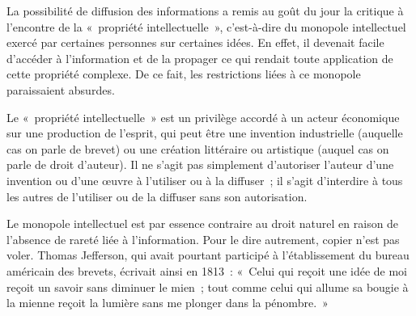 La possibilité de diffusion des informations a remis au goût du jour la critique à l'encontre de la «~propriété intellectuelle~», c'est-à-dire du monopole intellectuel exercé par certaines personnes sur certaines idées. En effet, il devenait facile d'accéder à l'information et de la propager ce qui rendait toute application de cette propriété complexe. De ce fait, les restrictions liées à ce monopole paraissaient absurdes. %

Le «~propriété intellectuelle~» est un privilège accordé à un acteur économique sur une production de l'esprit, qui peut être une invention industrielle (auquelle cas on parle de brevet) ou une création littéraire ou artistique (auquel cas on parle de droit d'auteur). Il ne s'agit pas simplement d'autoriser l'auteur d'une invention ou d'une œuvre à l'utiliser ou à la diffuser~; il s'agit d'interdire à tous les autres de l'utiliser ou de la diffuser sans son autorisation.

Le monopole intellectuel est par essence contraire au droit naturel en raison de l'absence de rareté liée à l'information. Pour le dire autrement, copier n'est pas voler. Thomas Jefferson, qui avait pourtant participé à l'établissement du bureau américain des brevets, écrivait ainsi en 1813~: «~Celui qui reçoit une idée de moi reçoit un savoir sans diminuer le mien~; tout comme celui qui allume sa bougie à la mienne reçoit la lumière sans me plonger dans la pénombre.~» %

